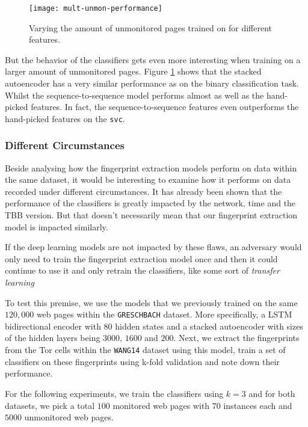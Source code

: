 \begin{figure}[!htb]
  \centering
  \texttt{[image: mult-unmon-performance]}
  \caption{Varying the amount of unmonitored pages trained on for different features.}
  \label{fig:mult-unmon-performance}
\end{figure}

But the behavior of the classifiers gets even more interesting when training on a larger amount of unmonitored pages.
Figure \ref{fig:mult-unmon-performance} shows that the stacked autoencoder has a very similar performance as on the binary classification task.
Whilst the sequence-to-sequence model performs almost as well as the hand-picked features.
In fact, the sequence-to-sequence features even outperforms the hand-picked features on the \texttt{svc}.

\subsubsection{Different Circumstances}

Beside analysing how the fingerprint extraction models perform on data within the same dataset, it would be interesting to examine how it performs on data recorded under different circumstances.
It has already been shown that the performance of the classifiers is greatly impacted by the network, time and the TBB version.
But that doesn't necessarily mean that our fingerprint extraction model is impacted similarly.

If the deep learning models are not impacted by these flaws, an adversary would only need to train the fingerprint extraction model once and then it could continue to use it and only retrain the classifiers, like some sort of \textit{transfer learning}

To test this premise, we use the models that we previously trained on the same $120,000$ web pages within the \texttt{GRESCHBACH} dataset.
More specifically, a LSTM bidirectional encoder with $80$ hidden states and a stacked autoencoder with sizes of the hidden layers being $3000$, $1600$ and $200$.
Next, we extract the fingerprints from the Tor cells within the \texttt{WANG14} dataset using this model, train a set of classifiers on these fingerprints using k-fold validation and note down their performance.

For the following experiments, we train the classifiers using $k = 3$ and for both datasets, we  pick a total $100$ monitored web pages with $70$ instances each and $5000$ unmonitored web pages.

